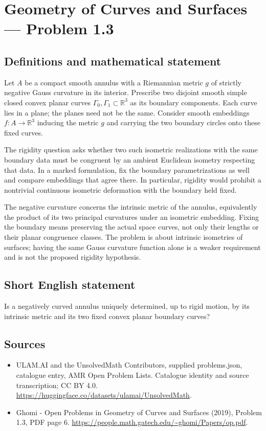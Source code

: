 \documentclass[11pt,a4paper]{article}
\begin{document}
\section*{Geometry of Curves and Surfaces — Problem 1.3}\label{statement}

\subsection{Definitions and mathematical statement}
Let $A$ be a compact smooth annulus with a Riemannian metric $g$
of strictly negative Gauss curvature in its interior. Prescribe
two disjoint smooth simple closed convex planar curves
$\Gamma_0,\Gamma_1\subset\mathbb R^3$ as its boundary components.
Each curve lies in a plane; the planes need not be the same.
Consider smooth embeddings $f:A\to\mathbb R^3$ inducing the metric
$g$ and carrying the two boundary circles onto these fixed curves.

The rigidity question asks whether two such isometric realizations
with the same boundary data must be congruent by an ambient
Euclidean isometry respecting that data. In a marked formulation,
fix the boundary parametrizations as well and compare embeddings
that agree there. In particular, rigidity would prohibit a
nontrivial continuous isometric deformation with the boundary
held fixed.

The negative curvature concerns the intrinsic metric of the
annulus, equivalently the product of its two principal curvatures
under an isometric embedding. Fixing the boundary means preserving
the actual space curves, not only their lengths or their planar
congruence classes. The problem is about intrinsic isometries of
surfaces; having the same Gauss curvature function alone is a
weaker requirement and is not the proposed rigidity hypothesis.
\subsection{Short English statement}
Is a negatively curved annulus uniquely determined, up to rigid
motion, by its intrinsic metric and its two fixed convex planar
boundary curves?
\subsection{Sources}
\begin{itemize}
\item[S1] ULAM.AI and the UnsolvedMath Contributors, supplied problems.json, catalogue entry, AMR Open Problem Lists. Catalogue identity and source transcription; CC BY 4.0.
\url{https://huggingface.co/datasets/ulamai/UnsolvedMath}.
\item[S2] Ghomi - Open Problems in Geometry of Curves and Surfaces (2019), Problem 1.3, PDF page 6. 
\url{https://people.math.gatech.edu/~ghomi/Papers/op.pdf}.
\end{itemize}
\end{document}

